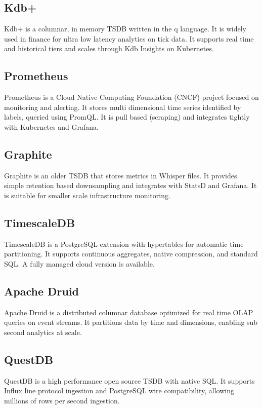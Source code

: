 \subsection{Kdb+} Kdb+ is a columnar, in memory TSDB written in the q language.
It is widely used in finance for ultra low latency analytics on tick data. It
supports real time and historical tiers and scales through Kdb Insights on
Kubernetes\cite{kdbDocs}.

\subsection{Prometheus} Prometheus is a Cloud Native Computing Foundation
(CNCF) project focused on monitoring and alerting. It stores multi dimensional
time series identified by labels, queried using PromQL. It is pull based
(scraping) and integrates tightly with Kubernetes and
Grafana\cite{prometheusDocs}.

\subsection{Graphite} Graphite is an older TSDB that stores metrics in Whisper
files. It provides simple retention based downsampling and integrates with
StatsD and Grafana. It is suitable for smaller scale infrastructure
monitoring\cite{graphiteDocs}.

\subsection{TimescaleDB} TimescaleDB is a PostgreSQL extension with hypertables
for automatic time partitioning. It supports continuous aggregates, native
compression, and standard SQL. A fully managed cloud version is
available\cite{timescaleDocs}.

\subsection{Apache Druid} Apache Druid is a distributed columnar database
optimized for real time OLAP queries on event streams. It partitions data by
time and dimensions, enabling sub second analytics at scale\cite{druidDocs}.

\subsection{QuestDB} QuestDB is a high performance open source TSDB with native
SQL. It supports Influx line protocol ingestion and PostgreSQL wire
compatibility, allowing millions of rows per second
ingestion\cite{questdbDocs}.

